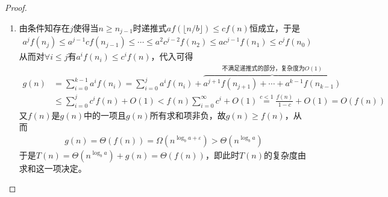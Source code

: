 \documentclass{ctexart}
\begin{document}
\begin{proof}
\begin{enumerate}
        \item 由条件知存在$j$使得当$n \ge n_{j-1}$时递推式$a f(\lfloor n/b \rfloor) \le c f(n)$恒成立，于是
              \begin{align*}
                  a^j f(n_j) \le a^{j-1} c f(n_{j-1}) \le \cdots \le a^2 c^{j-2} f(n_2) \le a c^{j-1} f(n_1) \le c^j f(n_0)
              \end{align*}
              从而对$\forall i \le j$有$a^i f(n_i) \le c^{i} f(n)$，代入可得
              \begin{align*}
                  g(n) & = \sum_{i=0}^{k-1} a^i f(n_i) = \sum_{i=0}^j a^i f(n_i) + \overbrace{a^{j+1} f(n_{j+1}) + \cdots + a^{k-1} f(n_{k-1})}^{\text{不满足递推式的部分，复杂度为}O(1)} \\
                       & \le \sum_{i=0}^j c^i f(n) + O(1) < f(n) \sum_{i=0}^\infty c^i + O(1) \overset{c<1}{=} \frac{f(n)}{1-c} + O(1) = O(f(n))
              \end{align*}
              又$f(n)$是$g(n)$中的一项且$g(n)$所有求和项非负，故$g(n) \ge f(n)$，从而
              \begin{align*}
                  g(n) = \Theta (f(n)) = \Omega(n^{\log_b a + \varepsilon}) > \Theta(n^{\log_b a})
              \end{align*}
              于是$T(n) = \Theta(n^{\log_b a}) + g(n) = \Theta (f(n))$，即此时$T(n)$的复杂度由求和这一项决定。
    \end{enumerate}


\end{proof}
\end{document}
